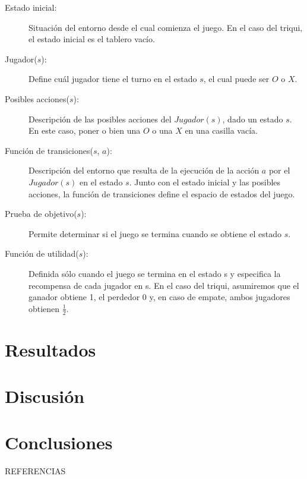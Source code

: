 \documentclass[11pt]{article}
\begin{document}
\begin{description}
\item[Estado inicial:] Situación del entorno desde el cual comienza el juego. En el caso del triqui, el estado inicial es el tablero vacío.
\item[Jugador($s$):] Define cuál jugador tiene el turno en el estado $s$, el cual puede ser $O$ o $X$.
\item[Posibles acciones($s$):] Descripción de las posibles acciones del $Jugador(s)$, dado un estado $s$. En este caso, poner o bien una $O$ o una $X$ en una casilla vacía.
\item[Función de transiciones($s$, $a$):] Descripción del entorno que resulta de la ejecución de la acción $a$ por el $Jugador(s)$ en el estado $s$. Junto con el estado inicial y las posibles acciones, la función de transiciones define el espacio de estados del juego.
\item[Prueba de objetivo($s$):] Permite determinar si el juego se termina cuando se obtiene el estado $s$.
\item[Función de utilidad($s$):] Definida sólo cuando el juego se termina en el estado s y especifica la recompensa de cada jugador en s. En el caso del triqui, asumiremos que el ganador obtiene 1, el perdedor 0 y, en caso de empate, ambos jugadores obtienen $\frac{1}{2}$.
\end{description}

\section{Resultados}

\section{Discusión}

\section{Conclusiones}

REFERENCIAS
\end{document}
